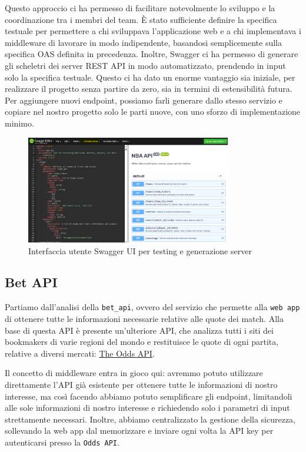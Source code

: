 Questo approccio ci ha permesso di facilitare notevolmente lo sviluppo e la coordinazione tra i membri del team. È stato sufficiente definire la specifica testuale per permettere a chi sviluppava l'applicazione web e a chi implementava i middleware di lavorare in modo indipendente, basandosi semplicemente sulla specifica OAS definita in precedenza. Inoltre, Swagger ci ha permesso di generare gli scheletri dei server REST API in modo automatizzato, prendendo in input solo la specifica testuale. Questo ci ha dato un enorme vantaggio sia iniziale, per realizzare il progetto senza partire da zero, sia in termini di estensibilità futura. Per aggiungere nuovi endpoint, possiamo farli generare dallo stesso servizio e copiare nel nostro progetto solo le parti nuove, con uno sforzo di implementazione minimo.

\begin{figure}[H]
    \centering
    \includegraphics[width=0.8\textwidth]{img/swagger_ui.png}
    \caption{Interfaccia utente Swagger UI per testing e generazione server}
\end{figure}

\subsection{Bet API}

Partiamo dall'analisi della \texttt{bet\_api}, ovvero del servizio che permette alla \texttt{web app} di ottenere tutte le informazioni necessarie relative alle quote dei match. Alla base di questa API è presente un'ulteriore API, che analizza tutti i siti dei bookmakers di varie regioni del mondo e restituisce le quote di ogni partita, relative a diversi mercati: \href{https://the-odds-api.com/}{The Odds API}.

Il concetto di middleware entra in gioco qui: avremmo potuto utilizzare direttamente l'API già esistente per ottenere tutte le informazioni di nostro interesse, ma così facendo abbiamo potuto semplificare gli endpoint, limitandoli alle sole informazioni di nostro interesse e richiedendo solo i parametri di input strettamente necessari. Inoltre, abbiamo centralizzato la gestione della sicurezza, sollevando la web app dal memorizzare e inviare ogni volta la API key per autenticarsi presso la \texttt{Odds API}.

